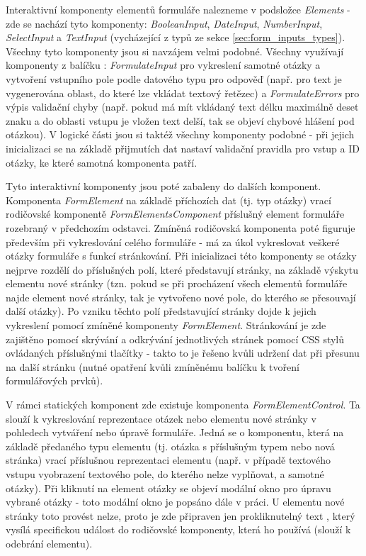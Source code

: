 		Interaktivní komponenty elementů formuláře nalezneme v podsložce \textit{Elements} - zde se nachází tyto komponenty: \textit{BooleanInput}, \textit{DateInput}, \textit{NumberInput}, \textit{SelectInput} a \textit{TextInput} (vycházející z typů ze sekce \ref{sec:form_inputs_types}). Všechny tyto komponenty jsou si navzájem velmi podobné. Všechny využívají komponenty z balíčku : \textit{FormulateInput} pro vykreslení samotné otázky a vytvoření vstupního pole podle datového typu pro odpověď (např. pro text je vygenerována oblast, do které lze vkládat textový řetězec) a \textit{FormulateErrors} pro výpis validační chyby (např. pokud má mít vkládaný text délku maximálně deset znaku a do oblasti vstupu je vložen text delší, tak se objeví chybové hlášení pod otázkou). V logické části jsou si taktéž všechny komponenty podobné - při jejich inicializaci se na základě přijmutích dat nastaví validační pravidla pro vstup a ID otázky, ke které samotná komponenta patří.
		
		Tyto interaktivní komponenty jsou poté zabaleny do dalších komponent. Komponenta \textit{FormElement} na základě příchozích dat (tj. typ otázky) vrací rodičovské komponentě \textit{FormElementsComponent} příslušný element formuláře rozebraný v předchozím odstavci. Zmíněná rodičovská komponenta poté figuruje především při vykreslování celého formuláře - má za úkol vykreslovat veškeré otázky formuláře s funkcí stránkování. Při inicializaci této komponenty se otázky nejprve rozdělí do příslušných polí, které představují stránky, na základě výskytu elementu nové stránky (tzn. pokud se při procházení všech elementů formuláře najde element nové stránky, tak je vytvořeno nové pole, do kterého se přesouvají další otázky). Po vzniku těchto polí představující stránky dojde k jejich vykreslení pomocí zmíněné komponenty \textit{FormElement}. Stránkování je zde zajištěno pomocí skrývání a odkrývání jednotlivých stránek pomocí CSS stylů ovládaných příslušnými tlačítky - takto to je řešeno kvůli udržení dat při přesunu na další stránku (nutné opatření kvůli zmíněnému balíčku k tvoření formulářových prvků).
		
		V rámci statických komponent zde existuje komponenta \textit{FormElementControl}. Ta slouží k vykreslování reprezentace otázek nebo elementu nové stránky v pohledech vytváření nebo úpravě formuláře. Jedná se o komponentu, která na základě předaného typu elementu (tj. otázka s příslušným typem nebo nová stránka) vrací příslušnou reprezentaci elementu (např. v případě textového vstupu vyobrazení textového pole, do kterého nelze vyplňovat, a samotné otázky). Při kliknutí na element otázky se objeví modální okno pro úpravu vybrané otázky - toto modální okno je popsáno dále v práci. U elementu nové stránky toto provést nelze, proto je zde připraven jen prokliknutelný text , který vysílá specifickou událost do rodičovské komponenty, která ho používá (slouží k odebrání elementu).
	
